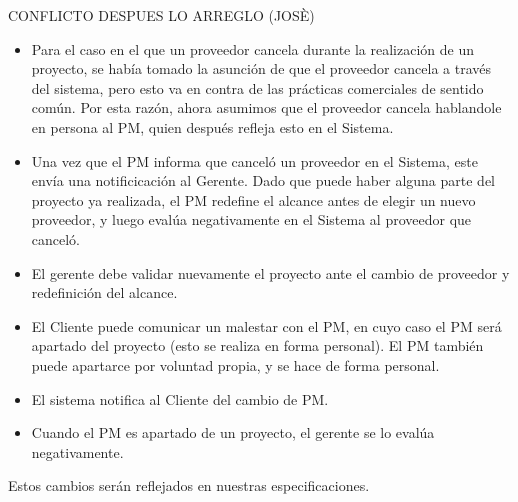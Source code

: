 CONFLICTO DESPUES LO ARREGLO (JOSÈ)
\begin{itemize}
  \item Para el caso en el que un proveedor cancela durante la realización de un proyecto, se había tomado la asunción de que el proveedor cancela a través del sistema, pero esto va en contra de las prácticas comerciales de sentido común. Por esta razón, ahora asumimos que el proveedor cancela hablandole en persona al PM, quien después refleja esto en el Sistema.
  \item Una vez que el PM informa que canceló un proveedor en el Sistema, este envía una notificicación al Gerente. Dado que puede haber alguna parte del proyecto ya realizada, el PM redefine el alcance antes de elegir un nuevo proveedor, y luego evalúa negativamente en el Sistema al proveedor que canceló.
  \item El gerente debe validar nuevamente el proyecto ante el cambio de proveedor y redefinición del alcance.
  \item El Cliente puede comunicar un malestar con el PM, en cuyo caso el PM será apartado del proyecto (esto se realiza en forma personal). El PM también puede apartarce por voluntad propia, y se hace de forma personal.
  \item El sistema notifica al Cliente del cambio de PM.
  \item Cuando el PM es apartado de un proyecto, el gerente se lo evalúa negativamente.

\end{itemize}

Estos cambios serán reflejados en nuestras especificaciones.
